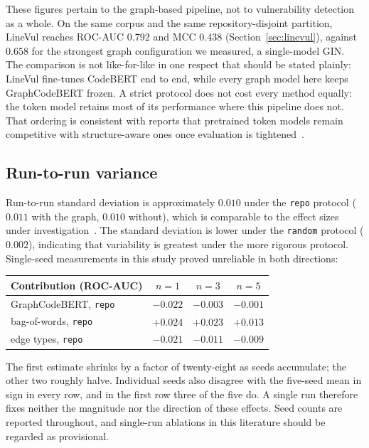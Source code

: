 These figures pertain to the graph-based pipeline, not to vulnerability
detection as a whole. On the same corpus and the same repository-disjoint
partition, LineVul reaches ROC-AUC $0.792$ and MCC $0.438$
(Section~\ref{sec:linevul}), against $0.658$ for the strongest graph
configuration we measured, a single-model GIN. The comparison is not
like-for-like in one respect that should be stated plainly: LineVul fine-tunes
CodeBERT end to end, while every graph model here keeps GraphCodeBERT frozen. A strict protocol does not cost every method equally: the token model
retains most of its performance where this pipeline does not. That ordering is consistent with reports that pretrained token models remain competitive with structure-aware ones once evaluation is tightened~\citep{steenhoek2023empiricalstudydeeplearning,li2025revisitingpretrainedlanguagemodels}.

\subsection{Run-to-run variance}
\label{sec:variance-result}
Run-to-run standard deviation is approximately $0.010$ under the \texttt{repo} protocol ($0.011$ with the graph, $0.010$ without), which is comparable to the effect sizes under investigation~\citep{arcuri2011practical,errica2020fair}. The standard deviation is lower under the \texttt{random} protocol ($0.002$), indicating that variability is greatest under the more rigorous protocol. Single-seed measurements in this study proved unreliable in
both directions:

\begin{center}
\begin{tabular}{lccc}
\toprule
\textbf{Contribution (ROC-AUC)} & $n{=}1$ & $n{=}3$ & $n{=}5$ \\
\midrule
GraphCodeBERT, \texttt{repo} & $-0.022$ & $-0.003$ & $-0.001$ \\
bag-of-words, \texttt{repo}  & $+0.024$ & $+0.023$ & $+0.013$ \\
edge types, \texttt{repo}    & $-0.021$ & $-0.011$ & $-0.009$ \\
\bottomrule
\end{tabular}
\end{center}

The first estimate shrinks by a factor of twenty-eight as seeds accumulate; the other two roughly halve. Individual seeds also disagree with the five-seed mean in sign in every row, and in the first row three of the five do. A single run therefore fixes neither the magnitude nor the direction of these effects. Seed counts are reported throughout, and single-run ablations in this literature should be regarded as provisional.

